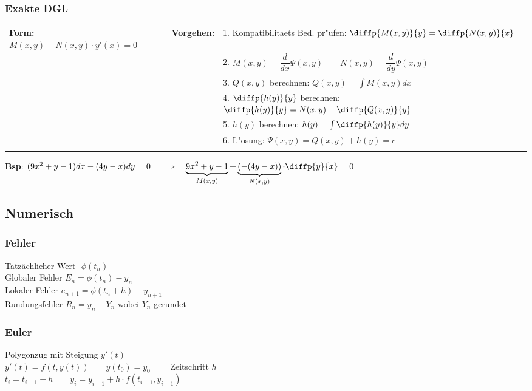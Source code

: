 \subsubsection{Exakte DGL}
\begin{tabular}{p{6cm}p{2cm}p{10.5cm}}
\textbf{Form:} $M(x,y) + N(x,y)\cdot y'(x) = 0$ &
\textbf{Vorgehen:}              &

1. Kompatibilitaets Bed. pr"ufen: $\diffp{M(x,y)}{y} = \diffp{N(x,y)}{x}$ \\ &&
2. $ M(x,y) = \dfrac{d}{dx}\Psi(x,y) \qquad N(x,y) = \dfrac{d}{dy}\Psi(x,y) $ \\ &&
3. $Q(x,y)$ berechnen: $Q(x,y) = \int M(x,y) dx$ \\ &&
4. $\diffp{h(y)}{y}$ berechnen: $\diffp{h(y)}{y} = N(x,y) - \diffp{Q(x,y)}{y}$ \\ &&
5. $h(y)$ berechnen: $h(y) = \int \diffp{h(y)}{y} dy $ \\ &&
6. L"osung: $\Psi(x,y) = Q(x,y) + h(y) = c $ \\ &&
\end{tabular}
\textbf{Bsp}: $(9x^2 + y -1)dx - (4y -x)dy = 0 \quad \Longrightarrow \quad  \underbrace{9x^2 +y -1}_{M(x,y)} + \underbrace{(-(4y -x))}_{N(x,y)} \cdot \diffp{y}{x} = 0$

\subsection{Numerisch}
\subsubsection{Fehler}

\begin{tabbing}
Tatzächlicher Wert  \= $\phi(t_n)$ \\
Globaler Fehler \> $E_n = \phi(t_n) - y_n$ \\
Lokaler Fehler \> $e_{n+1} = \phi(t_n + h) - y_{n+1}$ \\
Rundungsfehler \> $R_n = y_n - Y_n$ wobei $Y_n$ gerundet
\end{tabbing}

\subsubsection{Euler}
Polygonzug mit Steigung $y'(t)$\\
$y'(t)=f(t,y(t)) \qquad y(t_0)=y_0 \qquad$ Zeitschritt $h$\\
$t_i = t_{i-1} + h \qquad y_i=y_{i-1} + h \cdot f(t_{i-1},y_{i-1})$\\

